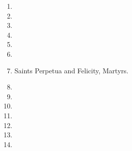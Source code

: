 		\begin{enumerate}
			\item %
			\item %
			\item %
			\item %
			\item %
			\item %
			\item Saints Perpetua and Felicity, Martyrs.  %
			\item %
			\item %
			\item %
			\item %
			\item %
			\item %
			\item %
		\end{enumerate}
